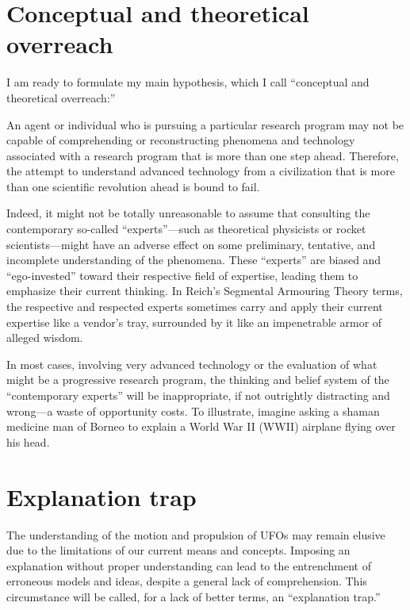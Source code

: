 \section{Conceptual and theoretical overreach}

I am ready to formulate my main hypothesis, which I call ``conceptual and theoretical overreach:''
\begin{svgraybox}
An agent or individual who is pursuing a particular research program may not be capable of comprehending or reconstructing phenomena and technology associated with a research program that is more than one step ahead. Therefore, the attempt to understand advanced technology from a civilization that is more than one scientific revolution ahead is bound to fail.
\end{svgraybox}

Indeed, it might not be totally unreasonable to assume that consulting the contemporary so-called ``experts''---such as
theoretical physicists or rocket scientists---might have an adverse effect on some preliminary, tentative,
and incomplete understanding of the phenomena. These ``experts'' are biased and ``ego-invested''
toward their respective field of expertise, leading them to emphasize their current thinking.
In Reich's Segmental Armouring Theory terms, the respective and respected experts sometimes carry and apply their current expertise like a vendor's tray, surrounded by it like an impenetrable armor of alleged wisdom.

In most cases, involving very advanced technology or the evaluation of what might be a progressive research program,
the thinking and belief system of the ``contemporary experts'' will be inappropriate, if not outrightly distracting and
wrong---a waste of opportunity costs. To illustrate, imagine asking a shaman medicine man of Borneo to explain a World War II (WWII) airplane flying over his head.

\section{Explanation trap}

The understanding of the motion and propulsion of UFOs may remain elusive due to the limitations of our current means and concepts. Imposing an explanation without proper understanding can lead to the entrenchment of erroneous models and ideas, despite a general lack of comprehension. This circumstance will be called, for a lack of better terms, an ``explanation trap.''

